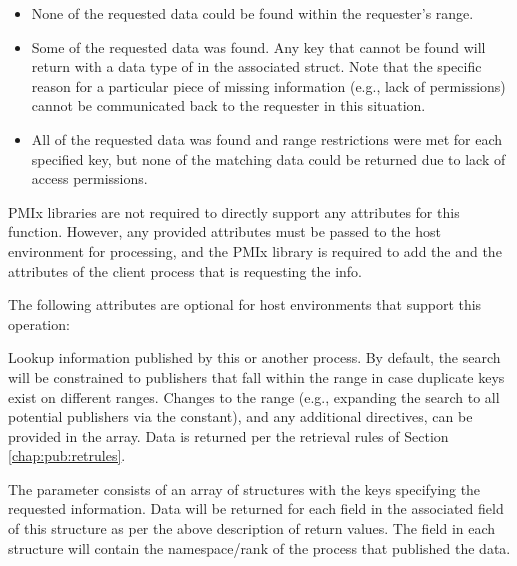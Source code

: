 \returnstart
\begin{itemize}
\item {} None of the requested data could be found within the requester's range.

\item {} Some of the requested data was found.
Any key that cannot be found will return with a data type of  in the associated  struct. Note that the specific reason for a particular piece of missing information (e.g., lack of permissions) cannot be communicated back to the requester in this situation.

\item {} All of the requested data was found and range restrictions were met for each specified key, but none of the matching data could be returned due to lack of access permissions.

\end{itemize}
\returnend

\reqattrstart
\ac{PMIx} libraries are not required to directly support any attributes for this function. However, any provided attributes must be passed to the host environment for processing, and the \ac{PMIx} library is required to add the  and the  attributes of the client process that is requesting the info.

\reqattrend

\optattrstart
The following attributes are optional for host environments that support this operation:


\optattrend

\descr

Lookup information published by this or another process.
By default, the search will be constrained to publishers that fall within the  range in case duplicate keys exist on different ranges.
Changes to the range (e.g., expanding the search to all potential publishers via the  constant), and any additional directives, can be provided in the  array. Data is returned per the retrieval rules of Section \ref{chap:pub:retrules}.

The  parameter consists of an array of  structures with the keys specifying the requested information.
Data will be returned for each  field in the associated  field of this structure as per the above description of return values. The  field in each  structure will contain the namespace/rank of the process that published the data.

